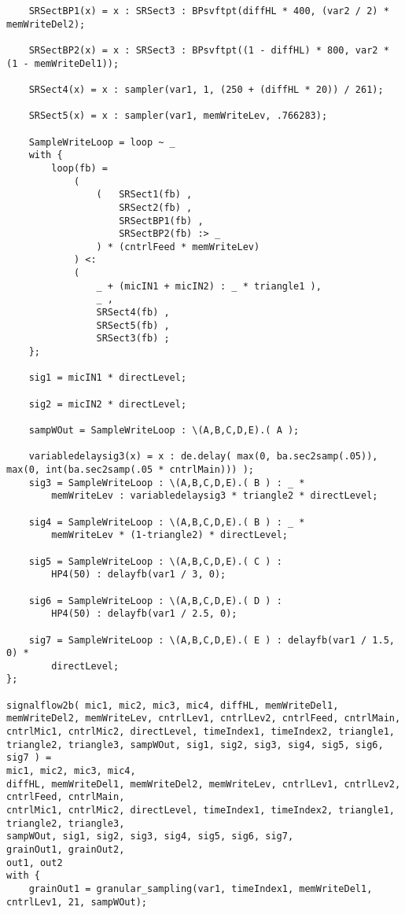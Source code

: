 \begin{lstlisting}
    SRSectBP1(x) = x : SRSect3 : BPsvftpt(diffHL * 400, (var2 / 2) * memWriteDel2);

    SRSectBP2(x) = x : SRSect3 : BPsvftpt((1 - diffHL) * 800, var2 * (1 - memWriteDel1));

    SRSect4(x) = x : sampler(var1, 1, (250 + (diffHL * 20)) / 261);

    SRSect5(x) = x : sampler(var1, memWriteLev, .766283);

    SampleWriteLoop = loop ~ _
    with {
        loop(fb) =
            (
                (   SRSect1(fb) ,
                    SRSect2(fb) ,
                    SRSectBP1(fb) ,
                    SRSectBP2(fb) :> _ 
                ) * (cntrlFeed * memWriteLev)
            ) <:
            (   
                _ + (micIN1 + micIN2) : _ * triangle1 ),
                _ ,
                SRSect4(fb) ,
                SRSect5(fb) ,
                SRSect3(fb) ;
    };

    sig1 = micIN1 * directLevel;

    sig2 = micIN2 * directLevel;

    sampWOut = SampleWriteLoop : \(A,B,C,D,E).( A );

    variabledelaysig3(x) = x : de.delay( max(0, ba.sec2samp(.05)), max(0, int(ba.sec2samp(.05 * cntrlMain))) );
    sig3 = SampleWriteLoop : \(A,B,C,D,E).( B ) : _ * 
        memWriteLev : variabledelaysig3 * triangle2 * directLevel;

    sig4 = SampleWriteLoop : \(A,B,C,D,E).( B ) : _ * 
        memWriteLev * (1-triangle2) * directLevel;

    sig5 = SampleWriteLoop : \(A,B,C,D,E).( C ) :
        HP4(50) : delayfb(var1 / 3, 0);

    sig6 = SampleWriteLoop : \(A,B,C,D,E).( D ) :
        HP4(50) : delayfb(var1 / 2.5, 0);

    sig7 = SampleWriteLoop : \(A,B,C,D,E).( E ) : delayfb(var1 / 1.5, 0) * 
        directLevel;
};

signalflow2b( mic1, mic2, mic3, mic4, diffHL, memWriteDel1, memWriteDel2, memWriteLev, cntrlLev1, cntrlLev2, cntrlFeed, cntrlMain, cntrlMic1, cntrlMic2, directLevel, timeIndex1, timeIndex2, triangle1, triangle2, triangle3, sampWOut, sig1, sig2, sig3, sig4, sig5, sig6, sig7 ) = 
mic1, mic2, mic3, mic4, 
diffHL, memWriteDel1, memWriteDel2, memWriteLev, cntrlLev1, cntrlLev2, cntrlFeed, cntrlMain, 
cntrlMic1, cntrlMic2, directLevel, timeIndex1, timeIndex2, triangle1, triangle2, triangle3, 
sampWOut, sig1, sig2, sig3, sig4, sig5, sig6, sig7, 
grainOut1, grainOut2, 
out1, out2
with {
    grainOut1 = granular_sampling(var1, timeIndex1, memWriteDel1, cntrlLev1, 21, sampWOut);


\end{lstlisting}
